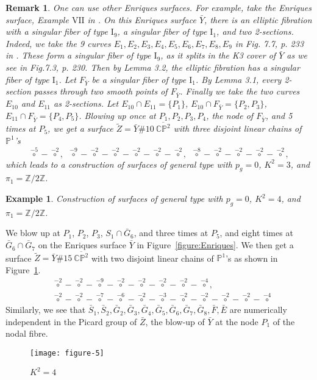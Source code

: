 \documentclass[twoside,11pt]{amsart}
\newtheorem{example}{Example}[section]
\newtheorem{remark}{Remark}[section]
\begin{document}
\begin{remark} One can use other Enriques surfaces. For example,
take the Enriques surface, Example $\mathrm{VII}$ in \cite{Kon}.
On this Enriques surface $\bar Y$, there is an elliptic fibration
with a singular fiber of type $\mathrm{I_9}$, a singular fiber of
type $\mathrm{I_1}$, and two 2-sections. Indeed, we take the 9
curves
 $E_1, E_2, E_3, E_4, E_5, E_6, E_7, E_8, E_9$
in Fig. 7.7, p. 233 in \cite{Kon}. These form a singular fiber of
type $\mathrm{I_9}$, as it splits in the K3 cover of $\bar Y$ as
we see in Fig.7.3, p. 230. Then by Lemma 3.2, the elliptic
fibration has a singular fiber of type $\mathrm{I_1}$. Let
$F_{\bar Y}$ be a singular fiber of type $\mathrm{I_1}$. By Lemma
3.1, every 2-section passes through two smooth points of $F_{\bar
Y}$. Finally we take the two curves $E_{10}$ and $E_{11}$ as
2-sections. Let $E_{10}\cap E_{11}=\{P_1\}$, $E_{10}\cap F_{\bar
Y}=\{P_2, P_3\}$, $E_{11}\cap F_{\bar Y}=\{P_4, P_5\}$. Blowing up
once at $P_1, P_2, P_3, P_4$, the node of $F_{\bar Y}$, and 5
times at $P_5$, we get a surface $\tilde Z=\bar Y\# 10\
\overline{{{\mathbb C}}{{\mathbb P}}^2}$ with three disjoint linear chains of
${{\mathbb P}}^1$'s
\[ {\overset{-5}{\circ}}-{\overset{-2}{\circ}}, \, \, \,
{\overset{-9}{\circ}}-{\overset{-2}{\circ}}-{\overset{-2}{\circ}}
-{\overset{-2}{\circ}}-{\overset{-2}{\circ}}-{\overset{-2}{\circ}},
\, \, \,
{\overset{-8}{\circ}}-{\overset{-2}{\circ}}-{\overset{-2}{\circ}}-{\overset{-2}{\circ}}
-{\overset{-2}{\circ}},\] which leads to a construction of
surfaces of general type with $p_g=0$, $K^2=3$, and
$\pi_1={{\mathbb Z}}/2{{\mathbb Z}}$.
\end{remark}

\begin{example} Construction of surfaces of general type with $p_g=0$,
$K^2=4$, and $\pi_1={{\mathbb Z}}/2{{\mathbb Z}}$. \end{example}

We blow up at $P_1$, $P_2$, $P_3$, $S_1 \cap \bar{G}_6$, and three times at $P_5$, and eight times at
$\bar{G}_6 \cap \bar{G}_7$ on the Enriques surface $\bar Y$ in Figure~\ref{figure:Enriques}. We then get a surface $\tilde
Z=\bar Y\# 15\ \overline{{{\mathbb C}}{{\mathbb P}}^2}$ with two disjoint linear
chains of ${{\mathbb P}}^1$'s as shown in Figure~\ref{figure:K^2=4}.
\begin{align*}
&\overset{-2}{\circ}-\overset{-2}{\circ}-\overset{-9}{\circ}-\overset{-2}{\circ}-\overset{-2}
{\circ}-\overset{-2}{\circ}-\overset{-2}{\circ}-\overset{-4}{\circ},\\
&\overset{-2}{\circ}-\overset{-2}{\circ}-\overset{-7}{\circ}-\overset{-6}{\circ}-\overset{-2}
{\circ}-\overset{-3}{\circ}-\overset{-2}{\circ}-\overset{-2}{\circ}-\overset{-2}{\circ}-\overset{-2}{\circ}-\overset{-4}{\circ}
\end{align*}
Similarly, we see that $\bar S_1, \bar S_2, \bar G_2, \bar G_3,
\bar G_4, \bar G_5, \bar G_6, \bar G_7, \bar G_8, \bar F, \bar E$
are numerically independent in the Picard group of $\bar Z$, the
blow-up of $\bar Y$ at the node $P_1$ of the nodal fibre. {\medskip}
\begin{figure}
\centering
\texttt{[image: figure-5]}
\caption{$K^2=4$}
\label{figure:K^2=4}
\end{figure}
\end{document}
